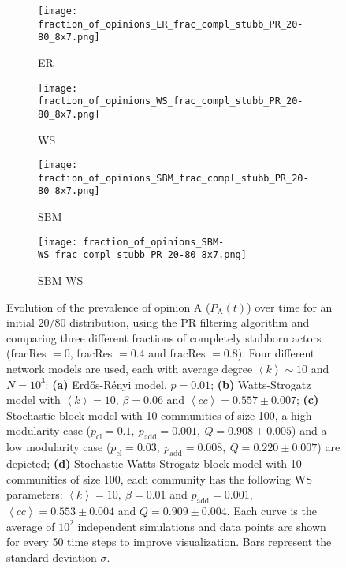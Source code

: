 \documentclass[11 pt , letterpaper , twoside , openright]{book}
\begin{document}
\begin{figure}[H]
  \begin{subfigure}[b]{0.49\textwidth}
    \caption{ER}
  	\texttt{[image: fraction\_of\_opinions\_ER\_frac\_compl\_stubb\_PR\_20-80\_8x7.png]}
  \end{subfigure}
  \begin{subfigure}[b]{0.49\textwidth}
    \caption{WS}
  	\texttt{[image: fraction\_of\_opinions\_WS\_frac\_compl\_stubb\_PR\_20-80\_8x7.png]}
  \end{subfigure}
  \begin{subfigure}[b]{0.49\textwidth}
    \caption{SBM}
    \texttt{[image: fraction\_of\_opinions\_SBM\_frac\_compl\_stubb\_PR\_20-80\_8x7.png]}
  \end{subfigure}
  \begin{subfigure}[b]{0.49\textwidth}
    \caption{SBM-WS}
    \texttt{[image: fraction\_of\_opinions\_SBM-WS\_frac\_compl\_stubb\_PR\_20-80\_8x7.png]}
  \end{subfigure}
  \captionsetup{format=plain}
  \caption[Evolution of the prevalence of opinion A ($P_\text{A}(t)$) over time for an initial $20/80$ opinion distribution, using the PR filtering algorithm and comparing three different fractions of completely stubborn actors (fracRes $= 0$, fracRes $= 0.4$ and fracRes $= 0.8$).]{Evolution of the prevalence of opinion A ($P_\text{A}(t)$) over time for an initial $20/80$ distribution, using the PR filtering algorithm and comparing three different fractions of completely stubborn actors (fracRes $= 0$, fracRes $= 0.4$ and fracRes $= 0.8$). Four different network models are used, each with average degree $\left<k\right> \sim 10$ and $N = 10^3$: \textbf{(a)} Erd\H{o}s-R\'{e}nyi model, $p=0.01$; \textbf{(b)} Watts-Strogatz model with $\left<k\right> = 10$, $\beta = 0.06$ and $\left<cc\right> = 0.557 \pm 0.007$; \textbf{(c)} Stochastic block model with 10 communities of size 100, a high modularity case ($p_{\text{cl}} = 0.1,\ p_{\text{add}} = 0.001,\ Q = 0.908 \pm 0.005$) and a low modularity case ($p_{\text{cl}} = 0.03,\ p_{\text{add}} = 0.008,\ Q = 0.220 \pm 0.007$) are depicted; \textbf{(d)} Stochastic Watts-Strogatz block model with 10 communities of size 100, each community has the following WS parameters: $\left<k\right> = 10,\ \beta = 0.01$ and $p_{\text{add}} = 0.001$, $\left<cc\right> = 0.553 \pm 0.004$ and $Q = 0.909 \pm 0.004$. Each curve is the average of $10^2$ independent simulations and data points are shown for every 50 time steps to improve visualization. Bars represent the standard deviation $\sigma$.}%
\label{ev_op_20_80_stubb_PR}
\end{figure}
\end{document}
